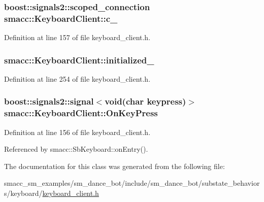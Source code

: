 \subsubsection[{\texorpdfstring{c\+\_\+}{c_}}]{\setlength{\rightskip}{0pt plus 5cm}boost\+::signals2\+::scoped\+\_\+connection smacc\+::\+Keyboard\+Client\+::c\+\_\+}\hypertarget{classsmacc_1_1KeyboardClient_ae0bf7c699ccb45ee933cf266ebb6107d}{}\label{classsmacc_1_1KeyboardClient_ae0bf7c699ccb45ee933cf266ebb6107d}


Definition at line 157 of file keyboard\+\_\+client.\+h.

\subsubsection[{\texorpdfstring{initialized\+\_\+}{initialized_}}]{ smacc\+::\+Keyboard\+Client\+::initialized\+\_\+\hspace{0.3cm}{\ttfamily [private]}}\hypertarget{classsmacc_1_1KeyboardClient_a7f898274b2d8035d00cef340103763f0}{}\label{classsmacc_1_1KeyboardClient_a7f898274b2d8035d00cef340103763f0}


Definition at line 254 of file keyboard\+\_\+client.\+h.

\subsubsection[{\texorpdfstring{On\+Key\+Press}{OnKeyPress}}]{\setlength{\rightskip}{0pt plus 5cm}boost\+::signals2\+::signal$<$void(char keypress)$>$ smacc\+::\+Keyboard\+Client\+::\+On\+Key\+Press}\hypertarget{classsmacc_1_1KeyboardClient_a715d1f764a8c6da3b7b2c26fe785dee5}{}\label{classsmacc_1_1KeyboardClient_a715d1f764a8c6da3b7b2c26fe785dee5}


Definition at line 156 of file keyboard\+\_\+client.\+h.



Referenced by smacc\+::\+Sb\+Keyboard\+::on\+Entry().



The documentation for this class was generated from the following file\+:\begin{DoxyCompactItemize}
\item 
smacc\+\_\+sm\+\_\+examples/sm\+\_\+dance\+\_\+bot/include/sm\+\_\+dance\+\_\+bot/substate\+\_\+behaviors/keyboard/\hyperlink{keyboard__client_8h}{keyboard\+\_\+client.\+h}\end{DoxyCompactItemize}
